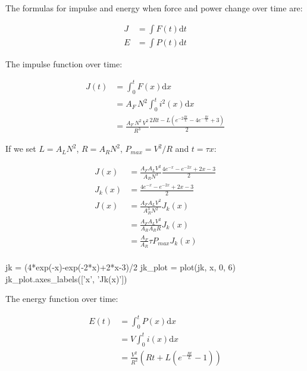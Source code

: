 \documentclass[]{../common/elementary-physics}
\begin{document}
The formulas for impulse and energy when force and power change over time are:

\begin{subequations}
\begin{align}
J &= \int F(t) \mathrm{d}t \\
E &= \int P(t) \mathrm{d}t
\end{align}
\end{subequations}

The impulse function over time:

\begin{subequations}
\begin{align}
J(t) &= \int^t_0 F(x) \mathrm{d}x \\
&= A_F \, N^2 \int^t_0 i^2(x) \mathrm{d}x \\
&= \frac{A_F \, N^2 \, V^2}{R^3} \frac{2 R t - L (e^{-2 \frac{R t}{L}} - 4 e^{-\frac{R t}{L}} + 3)}{2}
\end{align}
\end{subequations}

If we set $L = A_L N^2$, $R = A_R N^2$, $P_{max} = V^2 / R$ and  $t = \tau x$:

\begin{subequations}
\begin{align}
J(x) &= \frac{A_F A_L V^2}{A_R N^3} \frac{4 e^{-x}-e^{-2x}+2x-3}{2} \\
J_k(x) &= \frac{4 e^{-x}-e^{-2x}+2x-3}{2} \\
J(x) &= \frac{A_F A_L V^2}{A_R^3 N^2} J_k(x) \\
&= \frac{A_F A_L V^2}{A_R A_R R} J_k(x) \\
&= \frac{A_F}{A_R} \tau P_{max} J_k(x) \\
\end{align}
\end{subequations}

\begin{sagesilent}
jk = (4*exp(-x)-exp(-2*x)+2*x-3)/2
jk_plot = plot(jk, x, 0, 6)
jk_plot.axes_labels(['x', 'Jk(x)'])
\end{sagesilent}

The energy function over time:

\begin{subequations}
\begin{align}
E(t) &= \int^t_0 P(x) \mathrm{d}x \\
&= V \int^t_0 i(x) \mathrm{d}x \\
&= \frac{V^2}{R^2} (R t + L(e^{-\frac{R t}{L}} - 1))
\end{align}
\end{subequations}
\end{document}
